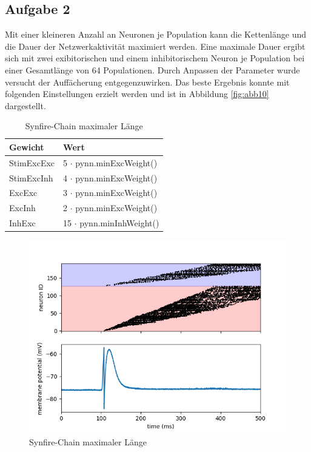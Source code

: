 \documentclass[10pt,a4paper]{scrartcl}
\begin{document}
\newpage 


\subsection{Aufgabe 2}
Mit einer kleineren Anzahl an Neuronen je Population kann die Kettenlänge und die Dauer der Netzwerkaktivität maximiert werden. Eine maximale Dauer 
ergibt sich mit zwei exibitorischen und einem inhibitorischem Neuron je Population bei einer Gesamtlänge von 64 Populationen. Durch Anpassen der Parameter wurde versucht der Auffächerung entgegenzuwirken. Das beste Ergebnis konnte mit folgenden Einstellungen erzielt werden und ist in Abbildung \ref{fig:abb10} dargestellt.

\begin{table}[H]
\centering
\captionsetup{justification=centering}
\caption{Synfire-Chain maximaler Länge}
\begin{tabular}{l|l}
 Gewicht&Wert\\
\hline
StimExcExc&5 $\cdot$ pynn.minExcWeight()\\
StimExcInh&4 $\cdot$ pynn.minExcWeight()\\
ExcExc&3 $\cdot$ pynn.minExcWeight()\\
ExcInh&2 $\cdot$ pynn.minExcWeight()\\
InhExc&15 $\cdot$ pynn.minInhWeight()
\end{tabular}
\label{tab:07}
\end{table}

\begin{figure} [ht]
\begin{center}
\label{fig:abb35}
\caption{Synfire-Chain maximaler Länge}
\includegraphics[scale=0.35]{pictures/chainlength_64.png}
\end{center}
\end{figure}
\end{document}
